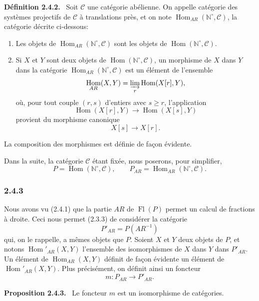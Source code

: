 \documentclass[11pt]{article}
\providecommand{\NN}{\mathbb{N}}
\newenvironment{statement}[1]{\par\medskip\noindent\textbf{#1.}\ }{\par\medskip}
\DeclareMathOperator{\Hom}{Hom}
\providecommand{\Hom}{\operatorname{Hom}}
\providecommand{\Fl}{\operatorname{Fl}}
\providecommand{\NN}{\mathbb N}
\providecommand{\cC}{\mathcal C}
\providecommand{\cC}{\mathcal C}
\providecommand{\Hom}{\operatorname{Hom}}
\begin{document}
\begin{statement}{Définition 2.4.2}
Soit $\cC$ une catégorie abélienne. On appelle catégorie des systèmes projectifs de $\cC$ à translations près, et on note $\Hom_{AR}(\NN^\circ,\cC)$, la catégorie décrite ci-dessous:
\begin{enumerate}[label=(\roman*)]
\item Les objets de $\Hom_{AR}(\NN^\circ,\cC)$ sont les objets de $\Hom(\NN^\circ,\cC)$.
\item Si $X$ et $Y$ sont deux objets de $\Hom(\NN^\circ,\cC)$, un morphisme de $X$ dans $Y$ dans la catégorie $\Hom_{AR}(\NN^\circ,\cC)$ est un élément de l'ensemble
\[
\Hom_{AR}(X,Y)=\varinjlim_r\Hom(X[r],Y),
\]
où, pour tout couple $(r,s)$ d'entiers avec $s\ge r$, l'application
\[
\Hom(X[r],Y)\longrightarrow\Hom(X[s],Y)
\]
provient du morphisme canonique
\[
X[s]\longrightarrow X[r].
\]
\end{enumerate}
La composition des morphismes est définie de façon évidente.
\end{statement}
Dans la suite, la catégorie $\cC$ étant fixée, nous poserons, pour simplifier,
\[
P=\Hom(\NN^\circ,\cC),\qquad P_{AR}=\Hom_{AR}(\NN^\circ,\cC).
\]

\subsubsection*{2.4.3}
Nous avons vu (2.4.1) que la partie $AR$ de $\Fl(P)$ permet un calcul de fractions à droite. Ceci nous permet (2.3.3) de considérer la catégorie
\[
P'_{AR}=P(AR^{-1})
\]
qui, on le rappelle, a mêmes objets que $P$. Soient $X$ et $Y$ deux objets de $P$, et notons $\Hom'_{AR}(X,Y)$ l'ensemble des isomorphismes de $X$ dans $Y$ dans $P'_{AR}$. Un élément de $\Hom_{AR}(X,Y)$ définit de façon évidente un élément de $\Hom'_{AR}(X,Y)$. Plus précisément, on définit ainsi un foncteur
\[
m:P_{AR}\longrightarrow P'_{AR}.
\]

\begin{statement}{Proposition 2.4.3}
Le foncteur $m$ est un isomorphisme de catégories.
\end{statement}
\end{document}
